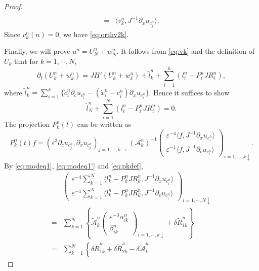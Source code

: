 \documentclass[11pt]{amsart}
\theoremstyle{remark}
\numberwithin{equation}{section}
\begin{document}
\begin{proof}
\begin{equation}
\begin{split}
\\=& {\langle} v_k^n,J^{-1}{\partial}_xu_{c_j^n}{\rangle}.
  \end{split}
\end{equation}
Since $v_k^n(n)=0$, we have  \eqref{eq:orthv2k}.
\par
Finally, we will prove $u^n=U_N^n+w_N^n$.
It follows from \eqref{eq:vk} and the definition of $U_k$ that 
for $k=1,\cdots, N$,
\begin{equation}
  \label{eq:ukwk}
  {\partial}_t(U_k^n+w_k^n)=JH'(U_k^n+w_k^n)+\tilde{l}_k^n+ \sum_{i=1}^k(l_i^n-P_i^nJR_i^n),
\end{equation}
where $\tilde{l}_k^n=
\sum_{i=1}^k\{\dot{c}_i^n{\partial}_cu_{c_i^n}-(\dot{x}_i^n-c_i^n){\partial}_xu_{c_i^n}\}$.
Hence it suffices to show
\begin{equation}
  \label{eq:diffpro}
 \tilde{l}_N^n+\sum_{i=1}^N\left(l_i^n-P_i^nJR_i^n\right)=0.
\end{equation}
The projection $P_k^n(t)$ can be written as 
\begin{equation}
  \label{eq:pkdef}
P_k^n(t)f=({\varepsilon}^3{\partial}_cu_{c_j^n},{\partial}_xu_{c_j^n})_{j=1,\cdots,k\rightarrow}
(\mathcal{A}_k^n)^{-1}
\begin{pmatrix}  {\varepsilon}^{-4}{\langle} f,J^{-1}{\partial}_xu_{c_i^n}{\rangle}
\\ {\varepsilon}^{-1}{\langle} f,J^{-1}{\partial}_cu_{c_i^n}{\rangle}
\end{pmatrix}_{i=1,\cdots,k\downarrow}.
\end{equation}
By \eqref{eq:modeq1}, \eqref{eq:modeq1'} and \eqref{eq:pkdef},
\begin{align*}
&  \begin{pmatrix}
{\varepsilon}^{-4}\sum_{k=1}^N{\langle} l_k^n-P_k^nJR_k^n, J^{-1}{\partial}_xu_{c_i^n}{\rangle}
\\ {\varepsilon}^{-1}\sum_{k=1}^N{\langle} l_k^n-P_k^nJR_k^n, J^{-1}{\partial}_cu_{c_i^n}{\rangle}
  \end{pmatrix}_{i=1,\cdots,N\downarrow}
\\=&
\sum_{k=1}^N\left\{\widetilde{\mathcal{A}}_k^n
\begin{pmatrix}{\varepsilon}^{-3}\alpha_{ik}^n \\ \beta_{ik}^n 
\end{pmatrix}_{i=1,\cdots,k\downarrow} +\delta{\widetilde{R}}_{1k}^n\right\}
\\=& \sum_{k=1}^N\left\{\delta{\widetilde{R}}_{1k}^n+\delta {\widetilde{R}}_{2k}^n
-\delta\widetilde{\mathcal{A}}_k^n

\end{align*}
\end{proof}
\end{document}
